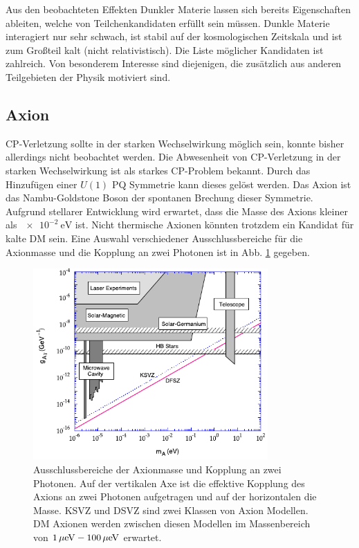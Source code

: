 Aus den beobachteten Effekten Dunkler Materie lassen sich bereits Eigenschaften ableiten, welche von Teilchenkandidaten erfüllt sein müssen.
Dunkle Materie interagiert nur sehr schwach, ist stabil auf der kosmologischen Zeitskala und ist zum Großteil kalt (nicht relativistisch).
Die Liste möglicher Kandidaten ist zahlreich.
Von besonderem Interesse sind diejenigen, die zusätzlich aus anderen Teilgebieten der Physik motiviert sind.

\subsection*{Axion}
\acs{CP}-Verletzung sollte in der starken Wechselwirkung möglich sein, konnte bisher allerdings nicht beobachtet werden.
Die Abwesenheit von CP-Verletzung in der starken Wechselwirkung ist als starkes CP-Problem bekannt.
Durch das Hinzufügen einer $U(1)$ \ac{PQ} Symmetrie kann dieses gelöst werden.\cite{Peccey1977}
Das Axion ist das Nambu-Goldstone Boson der spontanen Brechung dieser Symmetrie.
Aufgrund stellarer Entwicklung wird erwartet, dass die Masse des Axions kleiner als $\SI{e-2}{\electronvolt}$\cite{Raffelt1999} ist.
Nicht thermische Axionen könnten trotzdem ein Kandidat für kalte DM sein.\cite{Drees2012}
Eine Auswahl verschiedener Ausschlussbereiche für die Axionmasse und die Kopplung an zwei Photonen ist in Abb. \ref{fig:AxionExclusion} gegeben.

\begin{figure}[!b]
\begin{center}
\includegraphics[width=0.8\textwidth]{./fig/AxionExclusion.pdf}
\end{center}
\vspace{-0.5cm}
\caption{Ausschlussbereiche der Axionmasse und Kopplung an zwei Photonen.
Auf der vertikalen Axe ist die effektive Kopplung des Axions an zwei Photonen aufgetragen und auf der horizontalen die Masse.
KSVZ und DSVZ sind zwei Klassen von Axion Modellen.
DM Axionen werden zwischen diesen Modellen im Massenbereich von $\SI{1}{\mu\electronvolt}\--\SI{100}{\mu\electronvolt}$ erwartet.\cite{Rosenberg2010}}
\label{fig:AxionExclusion}
\end{figure}


